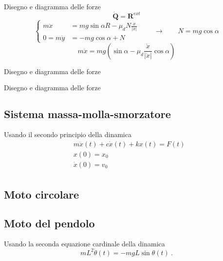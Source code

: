 \begin{example}
    {\color{red} Disegno e diagramma delle forze}
\begin{equation}
    \dot{\mathbf{Q}} = \mathbf{R}^{ext}
\end{equation}
\begin{equation}
    \begin{cases}
        m \ddot{x} & = m g \sin \alpha R - \mu_d N \frac{\dot{x}}{|\dot{x}|} \\
    0 = m \ddot{y} & = -m g \cos \alpha + N
    \end{cases} \qquad \rightarrow \qquad
    N = m g \cos \alpha
\end{equation}
\begin{equation}
    m \ddot{x} = mg \left( \sin \alpha - \mu_d \frac{\dot{x}}{|\dot{x}|} \cos \alpha  \right)
\end{equation}
\end{example}

\begin{example} 
    {\color{red} Disegno e diagramma delle forze}
\end{example}

\begin{example} 
    {\color{red} Disegno e diagramma delle forze}
\end{example}

\subsection{Sistema massa-molla-smorzatore}
Usando il secondo principio della dinamica
\begin{equation}
\begin{aligned}
    &  m \ddot{x}(t) + c \dot{x}(t) + k x(t) = F(t) \\
    & x(0) = x_0 \\
    & \dot{x}(0) = v_0 \\
\end{aligned}
\end{equation}
\subsection{Moto circolare}

\subsection{Moto del pendolo}
Usando la seconda equazione cardinale della dinamica
\begin{equation}
    m L^2 \ddot{\theta}(t) = - m g L \sin \theta(t) \ .
\end{equation}

